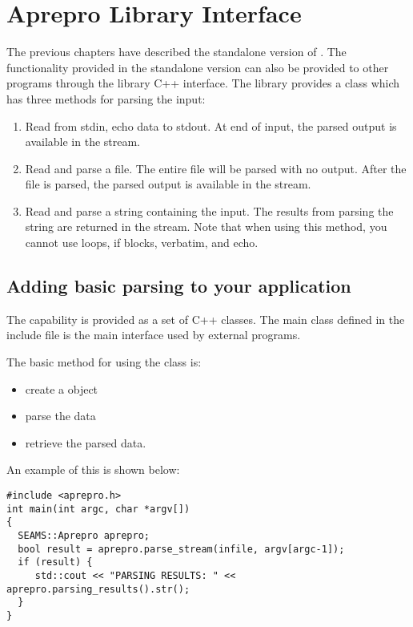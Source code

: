 \chapter{Aprepro Library Interface}

The previous chapters have described the standalone version of
\aprepro{}.  The functionality provided in the standalone version can
also be provided to other programs through the \aprepro{} library
C++ interface. The \aprepro{} library provides a 
class which has three methods for parsing the input:
\begin{enumerate}
\item Read from stdin, echo data to stdout. At end of input, the
parsed output is available in the 
stream.
\item Read and parse a file. The entire file will be parsed with no
output.  After the file is parsed, the parsed output is available in
the  stream.
\item Read and parse a string containing the \aprepro{} input. The
results from parsing the string are returned in the 
stream. Note that when using this method, you cannot use loops, if
blocks, verbatim, and echo.
\end{enumerate}

\section{Adding basic \aprepro{} parsing to your application}
The \aprepro{} capability is provided as a set of C++ classes. The
main  class defined in the 
include file is the main interface used by external programs.

The basic method for using the  class is:
\begin{itemize}
\item create a  object
\item parse the data
\item retrieve the parsed data.
\end{itemize}
An example of this is shown below:
\begin{lstlisting}
#include <aprepro.h>
int main(int argc, char *argv[])
{
  SEAMS::Aprepro aprepro;
  bool result = aprepro.parse_stream(infile, argv[argc-1]);
  if (result) {
     std::cout << "PARSING RESULTS: " << aprepro.parsing_results().str();
  }
}
\end{lstlisting}

